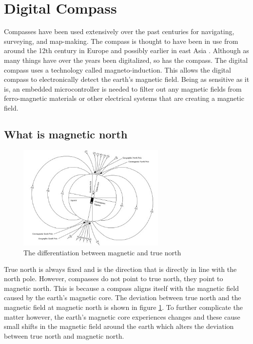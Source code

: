 \section{Digital Compass}
Compasses have been used extensively over the past centuries for navigating, surveying, and map-making. The compass is thought to have been in use from around the 12th century in Europe and possibly earlier in east Asia \cite{Jones2019}. Although as many things have over the years been digitalized, so has the compass. The digital compass uses a technology called magneto-induction. This allows the digital compass to electronically detect the earth's magnetic field. Being as sensitive as it is, an embedded microcontroller is needed to filter out any magnetic fields from ferro-magnetic materials or other electrical systems that are creating a magnetic field. \cite{AdvancedSafetyDevices2013}
\subsection{What is magnetic north}
\begin{figure}
	\begin{center}
		\includegraphics[width = 0.65\textwidth]{figures/tiltedDipole.jpg}
		\caption{The differentiation between magnetic and true north}
		\label{fig:2:magNorth}
	\end{center}
\end{figure}
True north is always fixed and is the direction that is directly in line with the north pole. However, compasses do not point to true north, they point to magnetic north. This is because a compass aligns itself with the magnetic field caused by the earth's magnetic core. The deviation between true north and the magnetic field at magnetic north is shown in figure \ref{fig:2:magNorth}. To further complicate the matter however, the earth's magnetic core experiences changes and these cause small shifts in the magnetic field around the earth which alters the deviation between true north and magnetic north. \cite{Jones2019}
